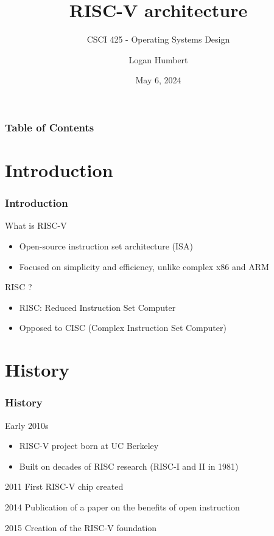 \documentclass{beamer}
\title{RISC-V architecture}
\subtitle{CSCI 425 - Operating Systems Design}
\author{Logan Humbert}
\institute{Colorado Mesa University}
\date{May 6, 2024}
\begin{document}
	\frame{\titlepage}
	
	\begin{frame}
		\frametitle{Table of Contents}
		\tableofcontents
	\end{frame}
	
	\section{Introduction}
	\begin{frame}
		\frametitle{Introduction}
		
		\begin{alertblock}{What is RISC-V}
			\begin{itemize}
				\item Open-source instruction set architecture (ISA)
				\item Focused on simplicity and efficiency, unlike complex x86 and ARM
			\end{itemize}
		\end{alertblock}
		
		\begin{alertblock}{RISC ?}
			\begin{itemize}
				\item RISC: Reduced Instruction Set Computer
				\item Opposed to CISC (Complex Instruction Set Computer)
			\end{itemize}
		\end{alertblock}
	\end{frame}
	
	\section{History}
	\begin{frame}
		\frametitle{History}
		
		\begin{alertblock}{Early 2010s}
			\begin{itemize}
				\item RISC-V project born at UC Berkeley
				\item Built on decades of RISC research (RISC-I and II in 1981)
			\end{itemize}
		\end{alertblock}
		
		\begin{alertblock}{2011}
			First RISC-V chip created
		\end{alertblock}
		
		\begin{alertblock}{2014}
			Publication of a paper on the benefits of open instruction
		\end{alertblock}
		
		\begin{alertblock}{2015}
			Creation of the RISC-V foundation
		\end{alertblock}
	\end{frame}
	
\end{document}
